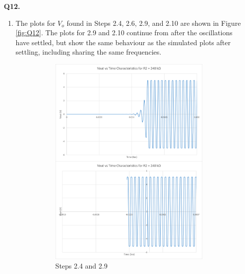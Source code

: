 \documentclass[12pt]{article}
\begin{document}
\begin{itemize}
    \item [\textbf{Q12.}]
    \begin{enumerate}
        \item The plots for $V_o$ found in Steps 2.4, 2.6, 2.9, and 2.10 are shown in Figure \ref{fig:Q12}. The plots for 2.9 and 2.10 continue from after the oscillations have settled, but show the same behaviour as the simulated plots after settling, including sharing the same frequencies.
        \begin{figure}[!ht]
            \centering
            \begin{subfigure}{0.49\textwidth}
                \centering
                \includegraphics[width=\textwidth]{Q12A}
                \caption{\label{fig:Q12A}Steps 2.4 and 2.9}
            \end{subfigure}
            \begin{subfigure}{0.49\textwidth}
                \centering

\end{subfigure}
\end{figure}
\end{enumerate}
\end{itemize}
\end{document}
